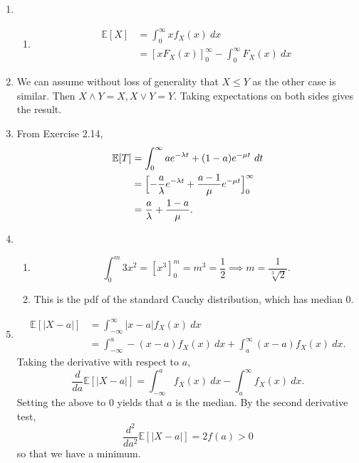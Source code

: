 \documentclass{article}
\begin{document}
\begin{enumerate}
    \item \begin{enumerate}
        \item \begin{align*}
            \mathbb{E}[X]
            &= \int_{0}^{\infty} xf_{X}(x) \ dx \\
            &= [xF_{X}(x)]_{0}^{\infty} - \int_{0}^{\infty} F_{X}(x) \ dx
        \end{align*}
    \end{enumerate}

    \item We can assume without loss of generality that $X \leq Y$ as the other case is similar. Then 
    $X \wedge Y = X, X \vee Y = Y$. Taking expectations on both sides gives the result.

    \item From Exercise 2.14, 
    \begin{align*}
        \mathbb{E}[T]
        &= \int_{0}^{\infty} ae^{-\lambda t} + (1 - a)e^{-\mu t} \ dt \\
        &= \Bigl[ -\frac{a}{\lambda}e^{-\lambda t} + \frac{a - 1}{\mu}e^{-\mu t} \Bigr]_{0}^{\infty} \\
        &= \frac{a}{\lambda} + \frac{1 - a}{\mu}.
    \end{align*}

    \item \begin{enumerate}
        \item \[
        \int_{0}^{m} 3x^2 = [x^3]_{0}^{m} = m^3 = \frac{1}{2} \implies m = \frac{1}{\sqrt[3]{2}}.
        \]

        \item This is the pdf of the standard Cauchy distribution, which has median 0.
    \end{enumerate}

    \item \begin{align*}
        \mathbb{E}[|X - a|]
        &= \int_{-\infty}^{\infty} |x - a| f_{X}(x) \ dx \\
        &= \int_{-\infty}^{a} -(x - a)f_{X}(x) \ dx + \int_{a}^{\infty} (x - a)f_{X}(x) \ dx.
    \end{align*}
    Taking the derivative with respect to $a$, 
    \[ \frac{d}{da} \mathbb{E}[|X - a|] 
    = \int_{-\infty}^{a} f_{X}(x) \ dx - \int_{a}^{\infty} f_{X}(x) \ dx. \]
    Setting the above to 0 yields that $a$ is the median. By the second derivative test, 
    \[ \frac{d^2}{da^2} \mathbb{E}[|X - a|] = 2f(a) > 0 \]
    so that we have a minimum.


\end{enumerate}
\end{document}
